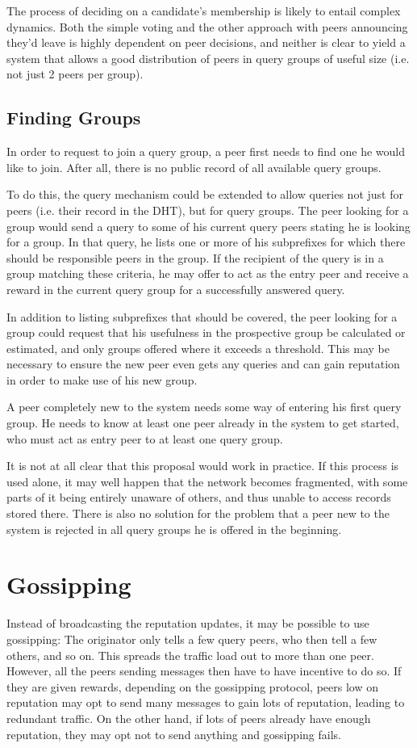 The process of deciding on a candidate's membership is likely to entail complex
dynamics. Both the simple voting and the other approach with peers announcing
they'd leave is highly dependent on peer decisions, and neither is clear to
yield a system that allows a good distribution of peers in query groups of
useful size (i.e. not just 2 peers per group).

\subsection{Finding Groups}
In order to request to join a query group, a peer first needs to find one he
would like to join. After all, there is no public record of all available query
groups.

To do this, the query mechanism could be extended to allow queries not just for
peers (i.e. their record in the \ac{DHT}), but for query groups. The peer
looking for a group would send a query to some of his current query peers
stating he is looking for a group. In that query, he lists one or more of his
subprefixes for which there should be responsible peers in the group. If the
recipient of the query is in a group matching these criteria, he may offer to
act as the entry peer and receive a reward in the current query group for a
successfully answered query.

In addition to listing subprefixes that should be covered, the peer looking for
a group could request that his usefulness in the prospective group be calculated
or estimated, and only groups offered where it exceeds a threshold. This may be
necessary to ensure the new peer even gets any queries and can gain reputation
in order to make use of his new group.

A peer completely new to the system needs some way of entering his first query
group. He needs to know at least one peer already in the system to get started,
who must act as entry peer to at least one query group.

It is not at all clear that this proposal would work in practice. If this
process is used alone, it may well happen that the network becomes fragmented,
with some parts of it being entirely unaware of others, and thus unable to
access records stored there. There is also no solution for the problem that a
peer new to the system is rejected in all query groups he is offered in the
beginning.

\section{Gossipping}
Instead of broadcasting the reputation updates, it may be possible to use
gossipping: The originator only tells a few query peers, who then tell a few
others, and so on. This spreads the traffic load out to more than one peer.
However, all the peers sending messages then have to have incentive to do so. If
they are given rewards, depending on the gossipping protocol, peers low on
reputation may opt to send many messages to gain lots of reputation, leading to
redundant traffic. On the other hand, if lots of peers already have enough
reputation, they may opt not to send anything and gossipping fails.

